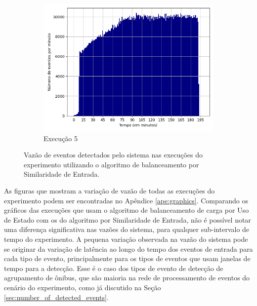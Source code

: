 \begin{figure}[h!]
\begin{subfigure}{.5\textwidth}
  \includegraphics[width=\linewidth]{figuras/graphics/histogram_vazao_10-dez-is.png}  
  \caption{Execução 5}
  \label{fig:histv-10-dez-is}
\end{subfigure}
\caption{Vazão de eventos detectados pelo sistema nas execuções do experimento utilizando o algoritmo de balanceamento por Similaridade de Entrada.}
\label{fig:histogram_full_IS}
\end{figure}


As figuras que mostram a variação de vazão de todas as execuções do experimento podem ser encontradas no Apêndice \ref{ape:graphics}. Comparando os gráficos das execuções que usam o algoritmo de balanceamento de carga por Uso de Estado com os do algoritmo por Similaridade de Entrada, não é possível notar uma diferença significativa nas vazões do sistema, para qualquer sub-intervalo de tempo do experimento. A pequena variação observada na vazão do sistema pode se originar da variação de latência ao longo do tempo dos eventos de entrada para cada tipo de evento, principalmente para os tipos de eventos que usam janelas de tempo para a detecção. Esse é o caso dos tipos de evento de detecção de agrupamento de ônibus, que são maioria na rede de processamento de eventos do cenário do experimento, como já discutido na Seção \ref{sec:number_of_detected_events}.








